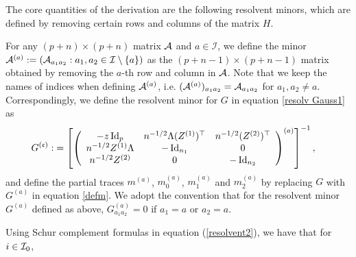 \medskip
{}
The core quantities of the derivation are the following resolvent minors, which are defined by removing certain rows and columns of the matrix $H$.
\begin{definition}\label{defn_Minor}
 For any $ (p+n)\times (p+n)$ matrix $\cal A$ and $a\in \mathcal I$, we define the minor $\cal A^{(a)}:=(\cal A_{a_1 a_2}:a_1, a_2 \in \mathcal I\setminus \{a\})$ as the $ (p+n-1)\times (p+n-1)$ matrix obtained by removing the $a$-th row and column in $\cal A$. Note that we keep the names of indices when defining $\cal A^{(a)}$, i.e. $(\cal A^{(a)})_{a_1a_2}= \cal A_{a_1 a_2}$ for $a_1,a_2\ne a$. Correspondingly, we define the resolvent minor for $G$ in equation \eqref{resolv Gauss1} as %
\begin{align*}
G^{(\mathfrak c)}:&=\left[ \left( {\begin{array}{*{20}c}
   { -z\id_{p} } & n^{-1/2}\Lambda (Z^{(1)})^\top & n^{-1/2} (Z^{(2)})^\top  \\
   {n^{-1/2} Z^{(1)} \Lambda  } & {-\id_{n_1}} & 0 \\
   {n^{-1/2} Z^{(2)}} & 0 & {-\id_{n_2}}
   \end{array}} \right)^{(a)}\right]^{-1} ,
\end{align*}
and define the partial traces $m^{(a)}$, $m_0^{(a)}$, $m_1^{(a)}$ and $m_2^{(a)}$ by replacing $G$ with $G^{(a)}$ in equation \eqref{defm}. We adopt the convention that for the resolvent minor $G^{(a)}$ defined as above, $G^{(a)}_{a_1a_2} = 0$ if $a_1 =a$ or $a_2=a$.
\end{definition}
 Using Schur complement formulas in equation (\ref{resolvent2}), we have that for $i \in \cal I_0$, %
